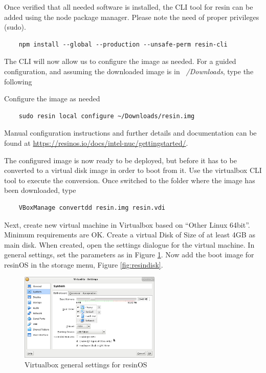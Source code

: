 \documentclass[]{scrartcl}
\begin{document}
Once verified that all needed software is installed, the CLI tool for resin can be added using the node package manager. Please note the need of proper privileges (sudo).

\begin{verbatim}
	npm install --global --production --unsafe-perm resin-cli
\end{verbatim}

The CLI will now allow us to configure the image as needed. For a guided configuration, and assuming the downloaded image is in \textit{~/Downloads}, type the following 

Configure the image as needed
\begin{verbatim}
	sudo resin local configure ~/Downloads/resin.img
\end{verbatim}

Manual configuration instructions and further details and documentation can be found at \url{https://resinos.io/docs/intel-nuc/gettingstarted/}.

The configured image is now ready to be deployed, but before it has to be converted to a virtual disk image in order to boot from it. Use the virtualbox CLI tool to execute the conversion. Once switched to the folder where the image has been downloaded, type
\begin{verbatim}
	VBoxManage convertdd resin.img resin.vdi
\end{verbatim}

Next, create new virtual machine in Virtualbox based on ``Other Linux 64bit''. Minimum requirements are OK. Create a virtual Disk of Size of at least 4GB as main disk. 
When created, open the settings dialogue for the virtual machine. In general settings, set the parameters as in Figure \ref{fig:resingen}. Now add the boot image for resinOS in the storage menu, Figure \ref{fig:resindisk}.

\begin{figure}
	\centering
	\includegraphics[width=0.6\textwidth]{resin-vbox}
	\caption{Virtualbox general settings for resinOS}
	\label{fig:resingen}
\end{figure}
\end{document}
